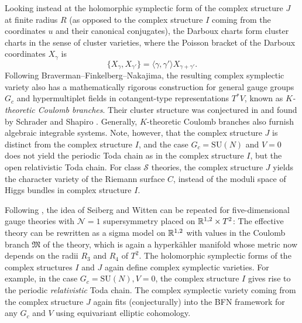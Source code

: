 Looking instead at the holomorphic symplectic form of the complex structure $J$ at finite radius $R$ (as opposed to the complex structure $I$ coming from the coordinates $u$ and their canonical conjugates), the Darboux charts form cluster charts in the sense of cluster varieties, where the Poisson bracket of the Darboux coordinates $X_\gamma$ is
\begin{equation}
	\{ X_\gamma, X_{\gamma'} \} = \langle \gamma,\gamma' \rangle X_{\gamma+\gamma'}.
\end{equation}
Following Braverman--Finkelberg--Nakajima, the resulting complex symplectic variety also has a mathematically rigorous construction for general gauge groups $G_c$ and hypermultiplet fields in cotangent-type representations $T^* V$, known as \emph{$K$-theoretic Coulomb branches}. Their cluster structure was conjectured in \cite{gaiotto_four-dimensional_2010,gaiotto_three_2013} and found by Schrader and Shapiro \cite{schrader_k-theoretic_2026}. Generally, $K$-theoretic Coulomb branches also furnish algebraic integrable systems. Note, however, that the complex structure $J$ is distinct from the complex structure $I$, and the case $G_c=\mathrm{SU}(N)$ and $V=0$ does not yield the periodic Toda chain as in the complex structure $I$, but the open relativistic Toda chain. For class $\mathcal{S}$ theories, the complex structure $J$ yields the character variety of the Riemann surface $C$, instead of the moduli space of Higgs bundles in complex structure $I$.

Following \cite{nekrasov_five_1998}, the idea of Seiberg and Witten can be repeated for five-dimension\-al gauge theories with $\mathcal{N}=1$ supersymmetry placed on $\mathbb{R}^{1,2} \times T^2$: The effective theory can be rewritten as a sigma model on $\mathbb{R}^{1,2}$ with values in the Coulomb branch $\mathfrak{M}$ of the theory, which is again a hyperkähler manifold whose metric now depends on the radii $R_3$ and $R_4$ of $T^2$. The holomorphic symplectic forms of the complex structures $I$ and $J$ again define complex symplectic varieties. For example, in the case $G_c=\mathrm{SU}(N),V=0$, the complex structure $I$ gives rise to the periodic \emph{relativistic} Toda chain. The complex symplectic variety coming from the complex structure $J$ again fits (conjecturally) into the BFN framework for any $G_c$ and $V$ using equivariant elliptic cohomology. 

